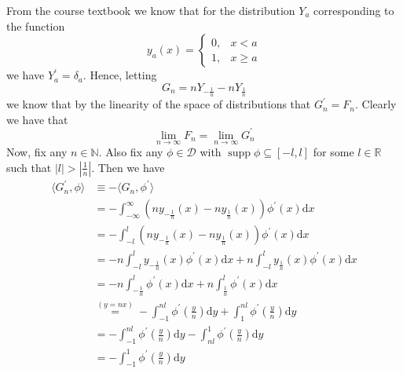 \documentclass{article}
\DeclareMathOperator\supp{supp}
\begin{document}
From the course textbook we know that for the distribution $Y_a$
corresponding to the function
%
\begin{equation*}
    y_a(x) =
        \begin{cases}
            0, & x < a \\
            1, & x \geq a
        \end{cases}
\end{equation*}
%
we have $Y_a^\prime = \delta_a$. Hence, letting
%
\begin{equation*}
    G_n = n Y_{- \frac{1}{n}} - n Y_{\frac{1}{n}}
\end{equation*}
%
we know that by the linearity of the space of distributions that
$G_n^\prime = F_n$. Clearly we have that
%
\begin{equation*}
    \lim_{n \to \infty} F_n = \lim_{n \to \infty} G_n^\prime
\end{equation*}
%
Now, fix any $n \in \mathbb{N}$. Also fix any $\phi \in \mathcal{D}$
with $\supp \phi \subseteq [-l, l]$ for some $l \in \mathbb{R}$ such
that $|l| > \left|\frac{1}{n}\right|$. Then we have
%
\begin{align*}
    \langle G_n^\prime, \phi \rangle
        &\equiv - \langle G_n, \phi^\prime \rangle \\
        &= - \int_{-\infty}^{\infty}
            \left(n y_{- \frac{1}{n}}(x) - n y_{\frac{1}{n}}(x)\right) \phi^\prime(x)
            \mathrm{d} x \\
        &= - \int_{-l}^{l}
            \left(n y_{- \frac{1}{n}}(x) - n y_{\frac{1}{n}}(x)\right) \phi^\prime(x)
            \mathrm{d} x \\
        &= - n \int_{-l}^{l} y_{- \frac{1}{n}}(x) \phi^\prime(x) \mathrm{d} x
            + n \int_{-l}^{l} y_{\frac{1}{n}}(x) \phi^\prime(x) \mathrm{d} x \\
        &= - n \int_{- \frac{1}{n}}^{l} \phi^\prime(x) \mathrm{d} x
            + n \int_{\frac{1}{n}}^{l} \phi^\prime(x) \mathrm{d} x \\
        &\stackrel{(y = n x)}{=}
            - \int_{-1}^{n l} \phi^\prime\left(\frac{y}{n}\right) \mathrm{d} y
            + \int_{1}^{n l} \phi^\prime\left(\frac{y}{n}\right) \mathrm{d} y \\
        &= - \int_{-1}^{n l} \phi^\prime\left(\frac{y}{n}\right) \mathrm{d} y
            - \int_{n l}^{1} \phi^\prime\left(\frac{y}{n}\right) \mathrm{d} y \\
        &= - \int_{-1}^{1} \phi^\prime\left(\frac{y}{n}\right) \mathrm{d} y \\
\end{align*}
\end{document}
